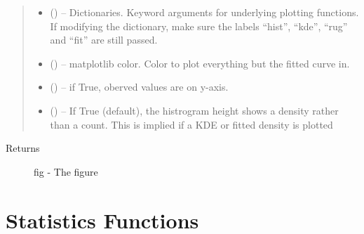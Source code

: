 \documentclass[letterpaper,10pt,english]{sphinxmanual}
\begin{document}
\begin{fulllineitems}
\begin{quote}
\begin{description}
\begin{itemize}
\item {} 
\sphinxstyleliteralstrong{, }\sphinxstyleliteralstrong{, } (\sphinxstyleliteralemphasis{,}\sphinxstyleliteralemphasis{}) -- Dictionaries. Keyword arguments for
underlying plotting functions. If modifying the dictionary, make
sure the labels ``hist'', ``kde'', ``rug'' and ``fit'' are still passed.

\item {} 
 () -- matplotlib color. Color to plot everything but the
fitted curve in.

\item {} 
 () -- if True, oberved values are on y-axis.

\item {} 
 () -- If True (default), the histrogram height shows
a density rather than a count. This is implied if a KDE or
fitted density is plotted

\end{itemize}

\end{description}\end{quote}
\begin{description}
\item[{Returns}] \leavevmode
fig - The figure

\end{description}

\end{fulllineitems}



\chapter{Statistics Functions}
\label{\detokenize{Stats:statistics-functions}}\label{\detokenize{Stats::doc}}
\end{document}
